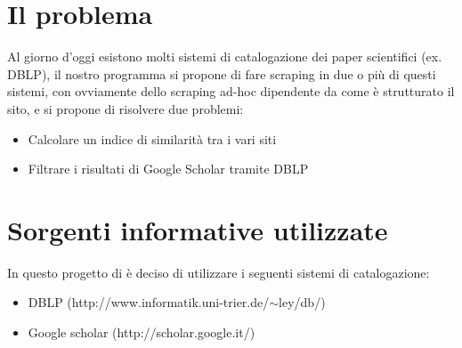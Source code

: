 \documentclass[12pt]{article}
\begin{document}
\maketitle

\section{Il problema}
Al giorno d'oggi esistono molti sistemi di catalogazione dei paper scientifici (ex. DBLP), il nostro programma si propone di fare scraping in due o pi\`u di questi sistemi, con ovviamente dello scraping ad-hoc dipendente da come \`e strutturato il sito, e si propone di risolvere due problemi:
\begin{itemize}
\item Calcolare un indice di similarit\`a tra i vari siti
\item Filtrare i risultati di Google Scholar tramite DBLP
\end{itemize}

\section{Sorgenti informative utilizzate}
In questo progetto di \`e deciso di utilizzare i seguenti sistemi di catalogazione:
\begin{itemize}
\item DBLP (http://www.informatik.uni-trier.de/$\sim$ley/db/)
\item Google scholar (http://scholar.google.it/)
\end{itemize}
\end{document}
